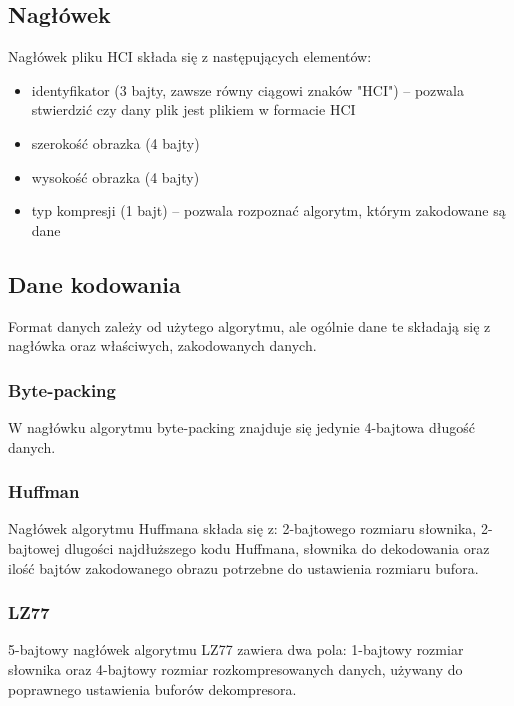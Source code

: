 \documentclass[12pt,a4paper]{article}
\begin{document}
		\subsection{Nagłówek}
			Nagłówek pliku HCI składa się z następujących elementów:
			\begin{itemize}
				\item identyfikator (3 bajty, zawsze równy ciągowi znaków "HCI") -- pozwala stwierdzić czy dany plik jest plikiem w formacie HCI
				\item szerokość obrazka (4 bajty)
				\item wysokość obrazka (4 bajty)
				\item typ kompresji (1 bajt) -- pozwala rozpoznać algorytm, którym zakodowane są dane
			\end{itemize}
		\subsection{Dane kodowania}
			Format danych zależy od użytego algorytmu, ale ogólnie dane te składają się z nagłówka oraz właściwych, zakodowanych danych.
			\subsubsection{Byte-packing}
				W nagłówku algorytmu byte-packing znajduje się jedynie 4-bajtowa długość danych.
			\subsubsection{Huffman}
				Nagłówek algorytmu Huffmana składa się z: 2-bajtowego rozmiaru słownika, 2-bajtowej dlugości najdłuższego kodu Huffmana, słownika do dekodowania oraz ilość bajtów zakodowanego obrazu potrzebne do ustawienia rozmiaru bufora.
			\subsubsection{LZ77}
				5-bajtowy nagłówek algorytmu LZ77 zawiera dwa pola: 1-bajtowy rozmiar słownika oraz 4-bajtowy rozmiar rozkompresowanych danych, używany do
				poprawnego ustawienia buforów dekompresora.
\end{document}
